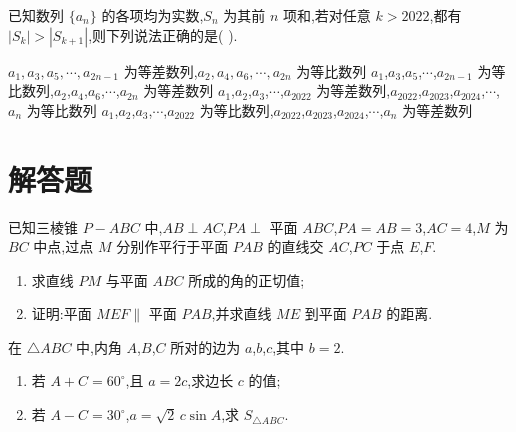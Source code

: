 \begin{problem}
已知数列 \(\{a_n\}\) 的各项均为实数,\(S_n\) 为其前 \(n\) 项和,若对任意 \(k>2022\),都有 \(\left|S_k\right|>\left|S_{k+1}\right|\),则下列说法正确的是( \quad ).

\choices
    {\(a_1,a_3,a_5,\cdots,a_{2n-1}\) 为等差数列,\(a_2,a_4,a_6,\cdots,a_{2n}\) 为等比数列}
    {\(a_1\),\(a_3\),\(a_5\),\(\cdots\),\(a_{2n-1}\) 为等比数列,\(a_2\),\(a_4\),\(a_6\),\(\cdots\),\(a_{2n}\) 为等差数列}
    {\(a_1\),\(a_2\),\(a_3\),\(\cdots\),\(a_{2022}\) 为等差数列,\(a_{2022}\),\(a_{2023}\),\(a_{2024}\),\(\cdots\),\(a_n\) 为等比数列}
    {\(a_1\),\(a_2\),\(a_3\),\(\cdots\),\(a_{2022}\) 为等比数列,\(a_{2022}\),\(a_{2023}\),\(a_{2024}\),\(\cdots\),\(a_n\) 为等差数列}
\end{problem}

\section{解答题}

\begin{problem}
已知三棱锥 \(P-ABC\) 中,\(AB\perp AC\),\(PA\perp\) 平面 \(ABC\),\(PA=AB=3\),\(AC=4\),\(M\) 为 \(BC\) 中点,过点 \(M\) 分别作平行于平面 \(PAB\) 的直线交 \(AC\),\(PC\) 于点 \(E\),\(F\).

\begin{enumerate}
\item 求直线 \(PM\) 与平面 \(ABC\) 所成的角的正切值;
\item 证明:平面 \(MEF\parallel\) 平面 \(PAB\),并求直线 \(ME\) 到平面 \(PAB\) 的距离.
\end{enumerate}

\end{problem}

\begin{problem}
在 \(\triangle ABC\) 中,内角 \(A\),\(B\),\(C\) 所对的边为 \(a\),\(b\),\(c\),其中 \(b=2\).

\begin{enumerate}
\item 若 \(A+C=60^\circ\),且 \(a=2c\),求边长 \(c\) 的值;
\item 若 \(A-C=30^\circ\),\(a=\sqrt2\,c\sin A\),求 \(S_{\triangle ABC}\).
\end{enumerate}
\end{problem}

